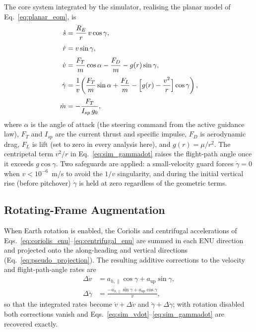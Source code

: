 The core system integrated by the simulator, realising the planar model of
Eq.~\eqref{eq:planar_eom}, is
\begin{align}
  \dot s      &= \frac{R_E}{r}\,v\cos\gamma,
               \label{eq:sim_sdot}\\[3pt]
  \dot r      &= v\sin\gamma,
               \label{eq:sim_rdot}\\[3pt]
  \dot v      &= \frac{F_T}{m}\cos\alpha
                 - \frac{F_D}{m}
                 - g(r)\sin\gamma,
               \label{eq:sim_vdot}\\[3pt]
  \dot\gamma  &= \frac{1}{v}\!\left(
                   \frac{F_T}{m}\sin\alpha
                   + \frac{F_L}{m}
                   - \Bigl[g(r) - \frac{v^2}{r}\Bigr]\cos\gamma
                 \right),
               \label{eq:sim_gammadot}\\[3pt]
  \dot m      &= -\frac{F_T}{I_{sp}\,g_0},
               \label{eq:sim_mdot}
\end{align}
where $\alpha$ is the angle of attack (the steering command from the active
guidance law), $F_T$ and $I_{sp}$ are the current thrust and specific impulse,
$F_D$ is aerodynamic drag, $F_L$ is lift (set to zero in every analysis here),
and $g(r)=\mu/r^{2}$. The centripetal term $v^{2}/r$ in
Eq.~\eqref{eq:sim_gammadot} raises the flight-path angle once it exceeds
$g\cos\gamma$. Two safeguards are applied: a small-velocity guard forces
$\dot\gamma=0$ when $v<10^{-6}$~m/s to avoid the $1/v$ singularity, and during
the initial vertical rise (before pitchover) $\dot\gamma$ is held at zero
regardless of the geometric terms.

\subsection{Rotating-Frame Augmentation}
\label{ssec:rot_augmentation}

When Earth rotation is enabled, the Coriolis and centrifugal accelerations
of Eqs.~\eqref{eq:coriolis_enu}--\eqref{eq:centrifugal_enu} are summed in each
ENU direction and projected onto the along-heading and vertical directions
(Eq.~\eqref{eq:pseudo_projection}). The resulting additive corrections to the
velocity and flight-path-angle rates are
\begin{align}
  \Delta\dot v     &= a_{h,\parallel}\cos\gamma + a_{\mathrm{up}}\sin\gamma,
                    \label{eq:sim_dv_pseudo}\\[3pt]
  \Delta\dot\gamma &= \frac{-a_{h,\parallel}\sin\gamma
                      + a_{\mathrm{up}}\cos\gamma}{v},
                    \label{eq:sim_dgamma_pseudo}
\end{align}
so that the integrated rates become $\dot v + \Delta\dot v$ and
$\dot\gamma + \Delta\dot\gamma$; with rotation disabled both corrections vanish
and Eqs.~\eqref{eq:sim_vdot}--\eqref{eq:sim_gammadot} are recovered exactly.


